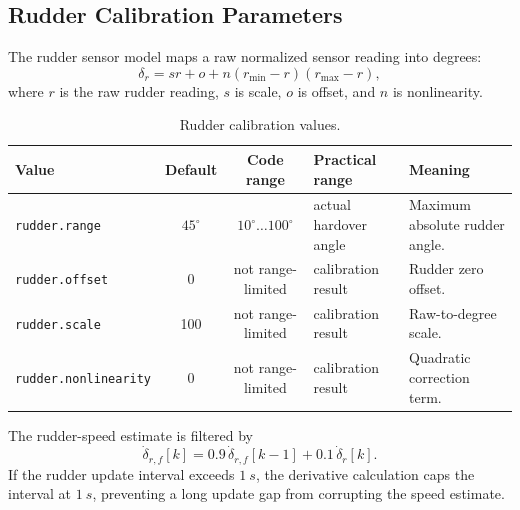 \documentclass[11pt,twocolumn]{article}
\begin{document}
\subsection{Rudder Calibration Parameters}
The rudder sensor model maps a raw normalized sensor reading into degrees:
\[
\delta_r
=
s r
+
o
+
n(r_{\min}-r)(r_{\max}-r),
\]
where \(r\) is the raw rudder reading, \(s\) is scale, \(o\) is offset,
and \(n\) is nonlinearity.
\begin{table}[t]
\centering
\caption{Rudder calibration values.}
\label{tab:pypilot-rudder-calibration}
\begin{tabularx}{\textwidth}{Z{0.23\textwidth}c c Z{0.16\textwidth}Y}
\toprule
Value & Default & Code range & Practical range & Meaning \\
\midrule
\texttt{rudder.range} &
\(45^\circ\) &
\(10^\circ\ldots100^\circ\) &
actual hardover angle &
Maximum absolute rudder angle. \\
\texttt{rudder.offset} &
\num{0} &
not range-limited &
calibration result &
Rudder zero offset. \\
\texttt{rudder.scale} &
\num{100} &
not range-limited &
calibration result &
Raw-to-degree scale. \\
\texttt{rudder.nonlinearity} &
\num{0} &
not range-limited &
calibration result &
Quadratic correction term. \\
\bottomrule
\end{tabularx}
\end{table}
The rudder-speed estimate is filtered by
\[
\dot{\delta}_{r,f}[k]
=
0.9\,\dot{\delta}_{r,f}[k-1]
+
0.1\,\dot{\delta}_{r}[k].
\]
If the rudder update interval exceeds \(\SI{1}{s}\), the derivative
calculation caps the interval at \(\SI{1}{s}\), preventing a long update
gap from corrupting the speed estimate.
\end{document}
